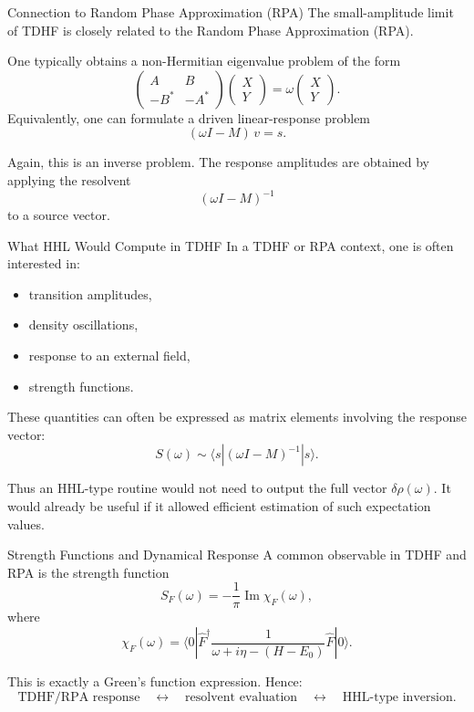 \documentclass{beamer}
\begin{document}

\begin{frame}{Connection to Random Phase Approximation (RPA)}
  The small-amplitude limit of TDHF is closely related to the Random Phase Approximation (RPA).

  One typically obtains a non-Hermitian eigenvalue problem of the form
  \[
  \begin{pmatrix}
    A & B \\
    -B^* & -A^*
  \end{pmatrix}
  \begin{pmatrix}
    X \\ Y
  \end{pmatrix}
  =
  \omega
  \begin{pmatrix}
    X \\ Y
  \end{pmatrix}.
  \]
  Equivalently, one can formulate a driven linear-response problem
  \[
  (\omega I - M)\,v = s.
  \]

  Again, this is an inverse problem. The response amplitudes are obtained by applying the resolvent
  \[
  (\omega I - M)^{-1}
  \]
  to a source vector.
\end{frame}


\begin{frame}{What HHL Would Compute in TDHF}
  In a TDHF or RPA context, one is often interested in:
  \begin{itemize}
  \item transition amplitudes,
  \item density oscillations,
  \item response to an external field,
  \item strength functions.
  \end{itemize}

  These quantities can often be expressed as matrix elements involving the response vector:
  \[
  S(\omega) \sim \langle s | (\omega I - M)^{-1} | s \rangle.
  \]

  Thus an HHL-type routine would not need to output the full vector \(\delta\rho(\omega)\). It would already be useful if it allowed efficient estimation of such expectation values.
\end{frame}


\begin{frame}{Strength Functions and Dynamical Response}
  A common observable in TDHF and RPA is the strength function
  \[
  S_F(\omega)
  =
  -\frac{1}{\pi}\operatorname{Im}\chi_F(\omega),
  \]
  where
  \[
  \chi_F(\omega)
  =
  \langle 0|\hat{F}^\dagger
  \frac{1}{\omega + i\eta - (H-E_0)}
  \hat{F}|0\rangle.
  \]

  This is exactly a Green's function expression. Hence:
  \[
  \text{TDHF/RPA response}
  \quad \longleftrightarrow \quad
  \text{resolvent evaluation}
  \quad \longleftrightarrow \quad
  \text{HHL-type inversion}.
  \]
\end{frame}
\end{document}
